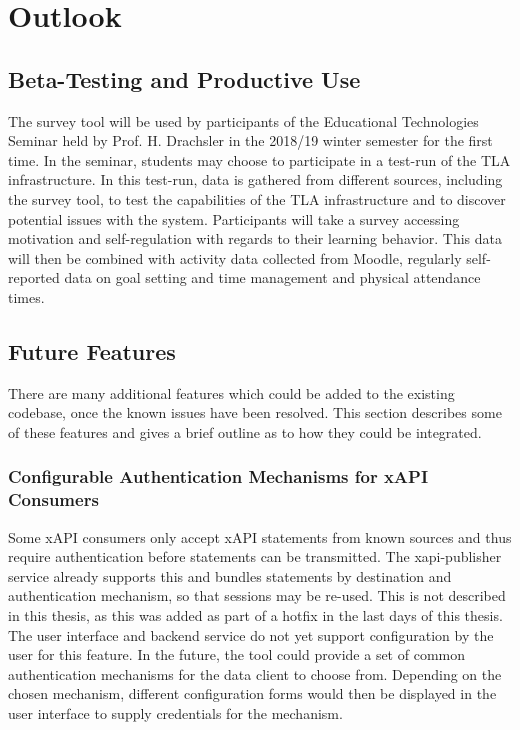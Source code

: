 \section{Outlook}
	\subsection{Beta-Testing and Productive Use}
		The survey tool will be used by participants of the Educational Technologies
		Seminar held by Prof. H. Drachsler in the 2018/19 winter semester for the first time.
		In the seminar, students may choose to participate in a test-run
		of the TLA infrastructure. In this test-run, data is gathered
		from different sources, including the survey tool, to test
		the capabilities of the TLA infrastructure and to discover
		potential issues with the system. Participants will
		take a survey accessing motivation and self-regulation
		with regards to their learning behavior. This data will
		then be combined with activity data collected from Moodle,
		regularly self-reported data on goal setting and time management
		and physical attendance times.

	\subsection{Future Features}
		There are many additional features which could be added to
		the existing codebase, once the known issues have been resolved.
		This section describes some of these features and gives a
		brief outline as to how they could be integrated.

		\subsubsection{Configurable Authentication Mechanisms for xAPI Consumers}
			Some xAPI consumers only accept xAPI statements from known
			sources and thus require authentication before statements
			can be transmitted. The xapi-publisher service already supports
			this and bundles statements by destination and authentication mechanism, 
			so that sessions may be re-used. This is not
			described in this thesis, as this was added as part of a hotfix
			in the last days of this thesis. The user interface
			and backend service do not yet support configuration
			by the user for this feature. In the future, the tool
			could provide a set of common authentication mechanisms
			for the data client to choose from. Depending on the
			chosen mechanism, different configuration forms
			would then be displayed in the user interface to supply
			credentials for the mechanism. 

